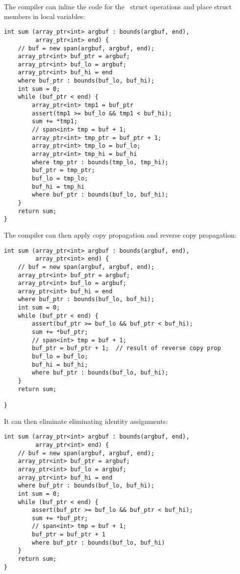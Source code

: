 The compiler can inline the code for the \spanptr\ struct operations
and place struct members in local variables:
\begin{lstlisting}
int sum (array_ptr<int> argbuf : bounds(argbuf, end),
         array_ptr<int> end) {
    // buf = new span(argbuf, argbuf, end);
    array_ptr<int> buf_ptr = argbuf; 
    array_ptr<int> buf_lo = argbuf;
    array_ptr<int> buf_hi = end
    where buf_ptr : bounds(buf_lo, buf_hi);
    int sum = 0;
    while (buf_ptr < end) {
        array_ptr<int> tmp1 = buf_ptr
        assert(tmp1 >= buf_lo && tmp1 < buf_hi);
        sum += *tmp1;
        // span<int> tmp = buf + 1;
        array_ptr<int> tmp_ptr = buf_ptr + 1;
        array_ptr<int> tmp_lo = buf_lo;
        array_ptr<int> tmp_hi = buf_hi
        where tmp_ptr : bounds(tmp_lo, tmp_hi);
        buf_ptr = tmp_ptr;
        buf_lo = tmp_lo;
        buf_hi = tmp_hi
        where buf_ptr : bounds(buf_lo, buf_hi);
    }
    return sum;
}
\end{lstlisting}

The compiler can then apply copy propagation and reverse copy
propagation:

\begin{lstlisting}
int sum (array_ptr<int> argbuf : bounds(argbuf, end), 
         array_ptr<int> end) {
    // buf = new span(argbuf, argbuf, end);
    array_ptr<int> buf_ptr = argbuf; 
    array_ptr<int> buf_lo = argbuf;
    array_ptr<int> buf_hi = end
    where buf_ptr : bounds(buf_lo, buf_hi);
    int sum = 0;
    while (buf_ptr < end) {
        assert(buf_ptr >= buf_lo && buf_ptr < buf_hi);
        sum += *buf_ptr;
        // span<int> tmp = buf + 1;
        buf_ptr = buf_ptr + 1;  // result of reverse copy prop
        buf_lo = buf_lo;
        buf_hi = buf_hi;
        where buf_ptr : bounds(buf_lo, buf_hi);
    }
    return sum;

}
\end{lstlisting}

It can then eliminate eliminating identity assignments:

\begin{lstlisting}
int sum (array_ptr<int> argbuf : bounds(argbuf, end), 
         array_ptr<int> end) {
    // buf = new span(argbuf, argbuf, end);
    array_ptr<int> buf_ptr = argbuf; 
    array_ptr<int> buf_lo = argbuf;
    array_ptr<int> buf_hi = end
    where buf_ptr : bounds(buf_lo, buf_hi);
    int sum = 0;
    while (buf_ptr < end) {
        assert(buf_ptr >= buf_lo && buf_ptr < buf_hi);
        sum += *buf_ptr;
        // span<int> tmp = buf + 1;
        buf_ptr = buf_ptr + 1
        where buf_ptr : bounds(buf_lo, buf_hi)
    }
    return sum;
}
\end{lstlisting}

